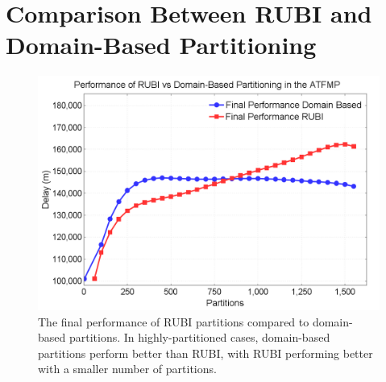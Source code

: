 \documentclass[smallcondensed]{svjour3}
\begin{document}
\section{Comparison Between RUBI and Domain-Based Partitioning}
\label{sec:Comparison}


\begin{figure}
\centering
\includegraphics[width=.75\columnwidth]{FinalOldvsFinalNew}
\caption{The final performance of RUBI partitions compared to domain-based partitions. In highly-partitioned cases, domain-based partitions perform better than RUBI, with RUBI performing better with a smaller number of partitions.}
\label{FinalOldvsFinalNew}
\end{figure}
\end{document}
